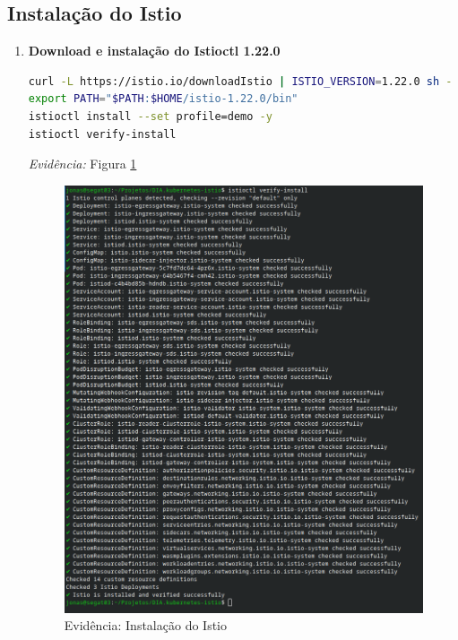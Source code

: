 \documentclass[9pt,a4paper,twocolumn,twoside]{tau-class/tau}
\begin{document}
\subsection{Instalação do Istio}
\begin{enumerate}[label=\arabic*.]
    \item\textbf{Download e instalação do Istioctl 1.22.0}
\begin{lstlisting}[language=Bash]
curl -L https://istio.io/downloadIstio | ISTIO_VERSION=1.22.0 sh -
export PATH="$PATH:$HOME/istio-1.22.0/bin"
istioctl install --set profile=demo -y
istioctl verify-install
\end{lstlisting}
\textit{Evidência:} Figura \ref{fig:istio}\\

\begin{figure}[h]
    \centering
    \includegraphics[width=1\linewidth]{figures/evidence-istio.png}
    \caption{Evidência: Instalação do Istio}
    \label{fig:istio}
\end{figure}
\end{enumerate}
\end{document}
